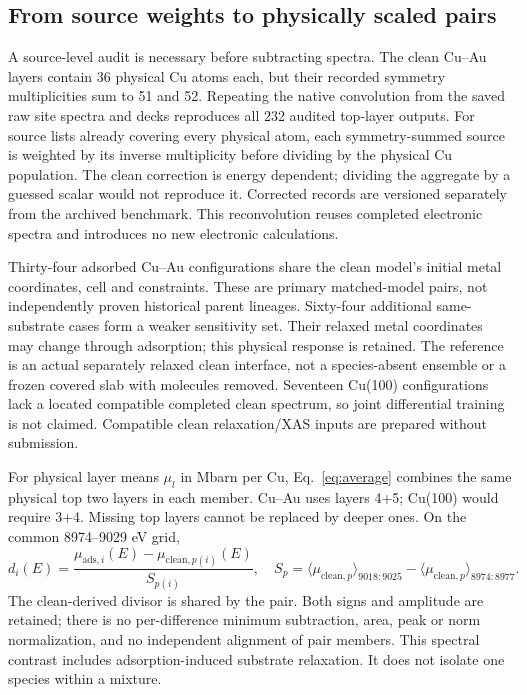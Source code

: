 \documentclass[11pt,a4paper]{article}
\begin{document}
\subsection{From source weights to physically scaled pairs}
A source-level audit is necessary before subtracting spectra. The clean Cu--Au layers contain 36 physical Cu atoms each, but their recorded symmetry multiplicities sum to 51 and 52. Repeating the native convolution from the saved raw site spectra and decks reproduces all 232 audited top-layer outputs. For source lists already covering every physical atom, each symmetry-summed source is weighted by its inverse multiplicity before dividing by the physical Cu population. The clean correction is energy dependent; dividing the aggregate by a guessed scalar would not reproduce it. Corrected records are versioned separately from the archived benchmark. This reconvolution reuses completed electronic spectra and introduces no new electronic calculations.

Thirty-four adsorbed Cu--Au configurations share the clean model's initial metal coordinates, cell and constraints. These are primary matched-model pairs, not independently proven historical parent lineages. Sixty-four additional same-substrate cases form a weaker sensitivity set. Their relaxed metal coordinates may change through adsorption; this physical response is retained. The reference is an actual separately relaxed clean interface, not a species-absent ensemble or a frozen covered slab with molecules removed. Seventeen Cu(100) configurations lack a located compatible completed clean spectrum, so joint differential training is not claimed. Compatible clean relaxation/XAS inputs are prepared without submission.

For physical layer means $\mu_l$ in Mbarn per Cu, Eq.~\ref{eq:average} combines the same physical top two layers in each member. Cu--Au uses layers 4+5; Cu(100) would require 3+4. Missing top layers cannot be replaced by deeper ones. On the common 8974--9029 eV grid,
\begin{equation}
 d_i(E)=\frac{\mu_{\mathrm{ads},i}(E)-\mu_{\mathrm{clean},p(i)}(E)}{S_{p(i)}},\quad
 S_p=\langle\mu_{\mathrm{clean},p}\rangle_{9018:9025}-\langle\mu_{\mathrm{clean},p}\rangle_{8974:8977}.
\label{eq:delta}
\end{equation}
The clean-derived divisor is shared by the pair. Both signs and amplitude are retained; there is no per-difference minimum subtraction, area, peak or norm normalization, and no independent alignment of pair members. This spectral contrast includes adsorption-induced substrate relaxation. It does not isolate one species within a mixture.
\end{document}
